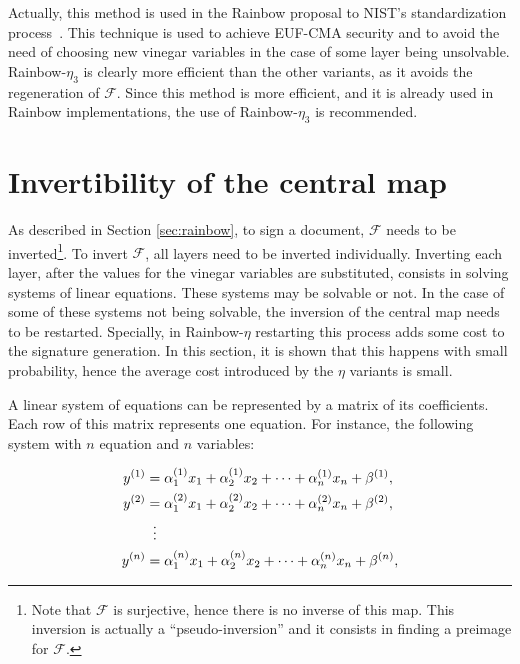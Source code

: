 \documentclass{ufsctex/ufsctex}
\begin{document}
Actually, this method is used in the Rainbow proposal to NIST's standardization
process~\cite{ding2017nist}. This technique is used to achieve
EUF-CMA
security and to avoid the need of choosing new vinegar variables in the case of
some layer being unsolvable. Rainbow-$\eta_3$ is clearly more efficient than
the other variants, as it avoids the regeneration of $\mathcal{F}$. Since this
method is more efficient, and it is already used in Rainbow implementations,
the use of Rainbow-$\eta_3$ is recommended.

\section{Invertibility of the central map}\label{sec:invertibility}

As described in Section \ref{sec:rainbow}, to sign a document, $\mathcal{F}$
needs to be inverted\footnote{Note that $\mathcal{F}$ is surjective, hence
there is no inverse of this map. This inversion is actually a
``pseudo-inversion'' and it consists in finding a preimage for $\mathcal{F}$.}.
To invert $\mathcal{F}$, all layers need to be inverted individually. Inverting
each layer, after the values for the vinegar variables are substituted,
consists in solving systems of linear equations. These systems may be solvable
or not. In the case of some of these systems not being solvable, the inversion
of the central map needs to be restarted. Specially, in Rainbow-$\eta$
restarting this process adds some cost to the signature generation. In this
section, it is shown that this happens with small probability, hence the
average cost introduced by the $\eta$ variants is small.

A linear system of equations can be represented by a matrix of its
coefficients. Each row of this matrix represents one equation. For instance,
the following system with $n$ equation and $n$ variables:

\begin{equation}
\begin{split}
y^{(1)} &= \alpha^{(1)}_1 x_1 + \alpha^{(1)}_2 x_2 + \cdots +
	\alpha^{(1)}_n x_n + \beta^{(1)}, \\
y^{(2)} &= \alpha^{(2)}_1 x_1 + \alpha^{(2)}_2 x_2 + \cdots +
	\alpha^{(2)}_n x_n + \beta^{(2)}, \\
&\vdotswithin{=} \\
y^{(n)} &= \alpha^{(n)}_1 x_1 + \alpha^{(n)}_2 x_2 + \cdots +
	\alpha^{(n)}_n x_n + \beta^{(n)}, \\
\end{split}
\end{equation}
\end{document}
